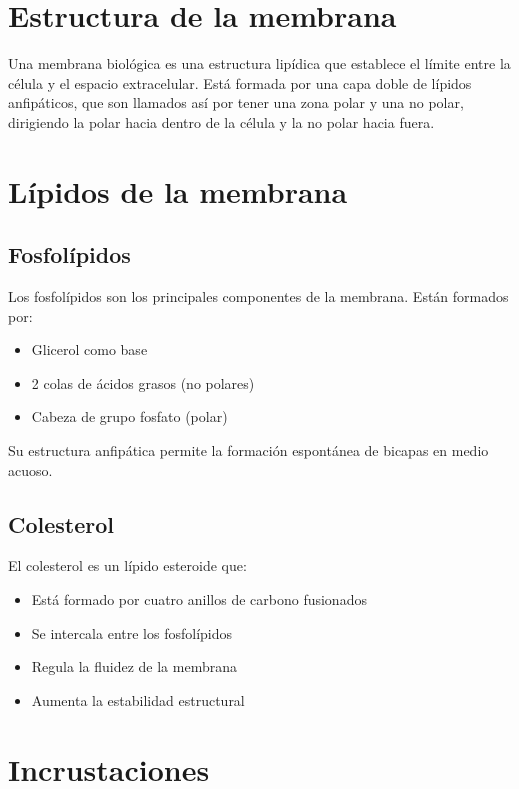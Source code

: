 \section{Estructura de la membrana}

Una membrana biológica es una estructura lipídica que establece el límite entre la célula y el espacio extracelular. Está formada por una capa doble de lípidos anfipáticos, que son llamados así por tener una zona polar y una no polar, dirigiendo la polar hacia dentro de la célula y la no polar hacia fuera.

\section{Lípidos de la membrana}

\subsection{Fosfolípidos}

Los fosfolípidos son los principales componentes de la membrana. Están formados por:
\begin{itemize}
    \item Glicerol como base
    \item 2 colas de ácidos grasos (no polares)
    \item Cabeza de grupo fosfato (polar)
\end{itemize}

Su estructura anfipática permite la formación espontánea de bicapas en medio acuoso.

\subsection{Colesterol}

El colesterol es un lípido esteroide que:
\begin{itemize}
    \item Está formado por cuatro anillos de carbono fusionados
    \item Se intercala entre los fosfolípidos
    \item Regula la fluidez de la membrana
    \item Aumenta la estabilidad estructural
\end{itemize}

\section{Incrustaciones}


